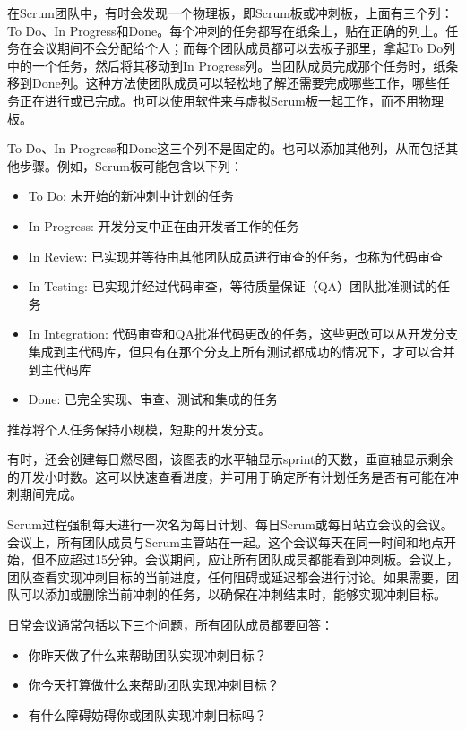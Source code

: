 在Scrum团队中，有时会发现一个物理板，即Scrum板或冲刺板，上面有三个列：To Do、In Progress和Done。每个冲刺的任务都写在纸条上，贴在正确的列上。任务在会议期间不会分配给个人；而每个团队成员都可以去板子那里，拿起To Do列中的一个任务，然后将其移动到In Progress列。当团队成员完成那个任务时，纸条移到Done列。这种方法使团队成员可以轻松地了解还需要完成哪些工作，哪些任务正在进行或已完成。也可以使用软件来与虚拟Scrum板一起工作，而不用物理板。

To Do、In Progress和Done这三个列不是固定的。也可以添加其他列，从而包括其他步骤。例如，Scrum板可能包含以下列：

\begin{itemize}
\item
To Do: 未开始的新冲刺中计划的任务

\item
In Progress: 开发分支中正在由开发者工作的任务

\item
In Review: 已实现并等待由其他团队成员进行审查的任务，也称为代码审查

\item
In Testing: 已实现并经过代码审查，等待质量保证（QA）团队批准测试的任务

\item
In Integration: 代码审查和QA批准代码更改的任务，这些更改可以从开发分支集成到主代码库，但只有在那个分支上所有测试都成功的情况下，才可以合并到主代码库

\item
Done: 已完全实现、审查、测试和集成的任务
\end{itemize}

推荐将个人任务保持小规模，短期的开发分支。

有时，还会创建每日燃尽图，该图表的水平轴显示sprint的天数，垂直轴显示剩余的开发小时数。这可以快速查看进度，并可用于确定所有计划任务是否有可能在冲刺期间完成。

Scrum过程强制每天进行一次名为每日计划、每日Scrum或每日站立会议的会议。会议上，所有团队成员与Scrum主管站在一起。这个会议每天在同一时间和地点开始，但不应超过15分钟。会议期间，应让所有团队成员都能看到冲刺板。会议上，团队查看实现冲刺目标的当前进度，任何阻碍或延迟都会进行讨论。如果需要，团队可以添加或删除当前冲刺的任务，以确保在冲刺结束时，能够实现冲刺目标。

日常会议通常包括以下三个问题，所有团队成员都要回答：

\begin{itemize}
\item
你昨天做了什么来帮助团队实现冲刺目标？

\item
你今天打算做什么来帮助团队实现冲刺目标？

\item
有什么障碍妨碍你或团队实现冲刺目标吗？
\end{itemize}

